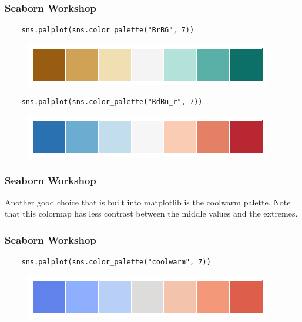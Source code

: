 \documentclass{beamer}
\begin{document}
\begin{frame}[fragile]
	\frametitle{Seaborn Workshop}
	\large
	\begin{verbatim}
	sns.palplot(sns.color_palette("BrBG", 7))
	\end{verbatim}
	
	\begin{figure}
		\centering
		\includegraphics[width=0.7\linewidth]{images/color_palettes_54_0}
		
	\end{figure}
	
	\begin{verbatim}
	sns.palplot(sns.color_palette("RdBu_r", 7))
	\end{verbatim}
	\begin{figure}
		\centering
		\includegraphics[width=0.7\linewidth]{images/color_palettes_55_0}
	\end{figure}
	
\end{frame}
\begin{frame}[fragile]
	\frametitle{Seaborn Workshop}
	\large
	
	
	Another good choice that is built into matplotlib is the coolwarm palette. Note that this colormap has less contrast between the middle values and the extremes.
\end{frame}
\begin{frame}[fragile]
	\frametitle{Seaborn Workshop}
	\large
	
	\begin{verbatim}
	sns.palplot(sns.color_palette("coolwarm", 7))
	\end{verbatim}
	
	\begin{figure}
		\centering
		\includegraphics[width=0.7\linewidth]{images/color_palettes_57_0}
	\end{figure}
	
	
\end{frame}
\end{document}
